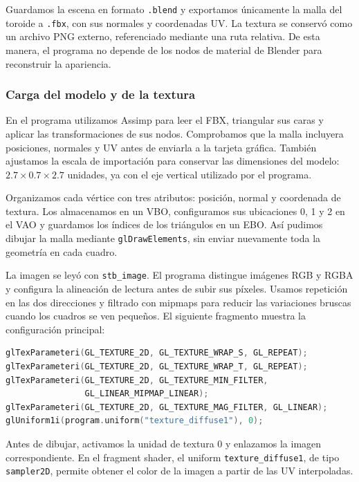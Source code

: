 Guardamos la escena en formato \texttt{.blend} y exportamos únicamente la malla del toroide a \texttt{.fbx}, con sus normales y coordenadas UV. La textura se conservó como un archivo PNG externo, referenciado mediante una ruta relativa. De esta manera, el programa no depende de los nodos de material de Blender para reconstruir la apariencia.

\subsubsection{Carga del modelo y de la textura}

En el programa utilizamos Assimp para leer el FBX, triangular sus caras y aplicar las transformaciones de sus nodos. Comprobamos que la malla incluyera posiciones, normales y UV antes de enviarla a la tarjeta gráfica. También ajustamos la escala de importación para conservar las dimensiones del modelo: $2.7\times0.7\times2.7$ unidades, ya con el eje vertical utilizado por el programa.

Organizamos cada vértice con tres atributos: posición, normal y coordenada de textura. Los almacenamos en un VBO, configuramos sus ubicaciones 0, 1 y 2 en el VAO y guardamos los índices de los triángulos en un EBO. Así pudimos dibujar la malla mediante \texttt{glDrawElements}, sin enviar nuevamente toda la geometría en cada cuadro.

La imagen se leyó con \texttt{stb\_image}. El programa distingue imágenes RGB y RGBA y configura la alineación de lectura antes de subir sus píxeles. Usamos repetición en las dos direcciones y filtrado con mipmaps para reducir las variaciones bruscas cuando los cuadros se ven pequeños. El siguiente fragmento muestra la configuración principal:

\begin{lstlisting}[language=C++, caption={Repetición, filtrado y asociación del sampler con la unidad de textura 0.}, label={lst:act3_textura}]
glTexParameteri(GL_TEXTURE_2D, GL_TEXTURE_WRAP_S, GL_REPEAT);
glTexParameteri(GL_TEXTURE_2D, GL_TEXTURE_WRAP_T, GL_REPEAT);
glTexParameteri(GL_TEXTURE_2D, GL_TEXTURE_MIN_FILTER,
                GL_LINEAR_MIPMAP_LINEAR);
glTexParameteri(GL_TEXTURE_2D, GL_TEXTURE_MAG_FILTER, GL_LINEAR);
glUniform1i(program.uniform("texture_diffuse1"), 0);
\end{lstlisting}

Antes de dibujar, activamos la unidad de textura 0 y enlazamos la imagen correspondiente. En el fragment shader, el uniform \texttt{texture\_diffuse1}, de tipo \texttt{sampler2D}, permite obtener el color de la imagen a partir de las UV interpoladas.

